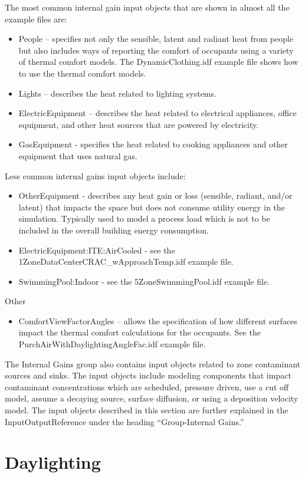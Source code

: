 The most common internal gain input objects that are shown in almost
all the example files are: 
\begin{itemize}
\item People -- specifies not only the sensible, latent and radiant heat
from people but also includes ways of reporting the comfort of occupants
using a variety of thermal comfort models. The DynamicClothing.idf
example file shows how to use the thermal comfort models.
\item Lights -- describes the heat related to lighting systems. 
\item ElectricEquipment -- describes the heat related to electrical appliances,
office equipment, and other heat sources that are powered by electricity. 
\item GasEquipment - specifies the heat related to cooking appliances and
other equipment that uses natural gas.
\end{itemize}
Less common internal gains input objects include: 
\begin{itemize}
\item OtherEquipment - describes any heat gain or loss (sensible, radiant,
and/or latent) that impacts the space but does not consume utility
energy in the simulation. Typically used to model a process load which
is not to be included in the overall building energy consumption.
\item ElectricEquipment:ITE:AirCooled - see the 1ZoneDataCenterCRAC\_wApproachTemp.idf
example file.
\item SwimmingPool:Indoor - see the 5ZoneSwimmingPool.idf example file.
\end{itemize}
Other 
\begin{itemize}
\item ComfortViewFactorAngles -- allows the specification of how different
surfaces impact the thermal comfort calculations for the occupants.
See the PurchAirWithDaylightingAngleFac.idf example file.
\end{itemize}
The Internal Gains group also contains input objects related to zone
contaminant sources and sinks. The input objects include modeling
components that impact contaminant concentrations which are scheduled,
pressure driven, use a cut off model, assume a decaying source, surface
diffusion, or using a deposition velocity model. The input objects
described in this section are further explained in the InputOutputReference
under the heading ``Group-Internal Gains.''

\section{Daylighting }

